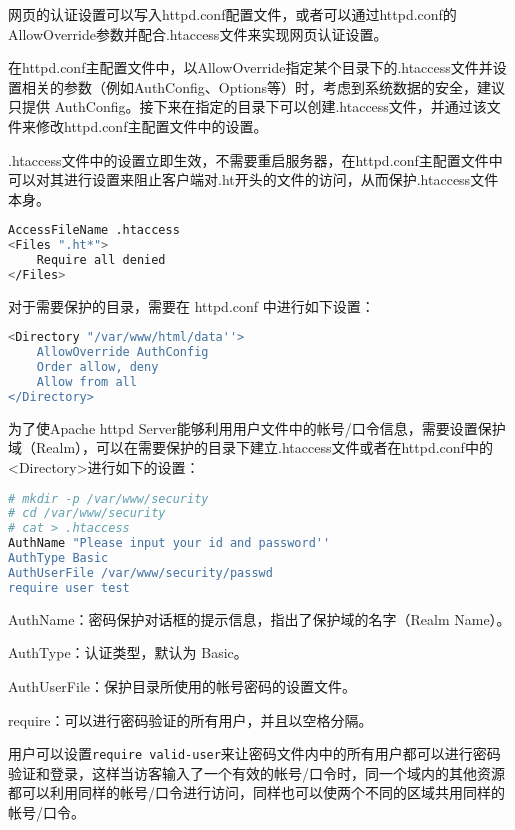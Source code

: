 网页的认证设置可以写入httpd.conf配置文件，或者可以通过httpd.conf的AllowOverride参数并配合.htaccess文件来实现网页认证设置。

在httpd.conf主配置文件中，以AllowOverride指定某个目录下的.htaccess文件并设置相关的参数（例如AuthConfig、Options等）时，考虑到系统数据的安全，建议只提供 AuthConfig。接下来在指定的目录下可以创建.htaccess文件，并通过该文件来修改httpd.conf主配置文件中的设置。


.htaccess文件中的设置立即生效，不需要重启服务器，在httpd.conf主配置文件中可以对其进行设置来阻止客户端对.ht开头的文件的访问，从而保护.htaccess文件本身。

\begin{lstlisting}[language=bash]
AccessFileName .htaccess
<Files ".ht*">
	Require all denied
</Files>
\end{lstlisting}

对于需要保护的目录，需要在 httpd.conf 中进行如下设置：


\begin{lstlisting}[language=bash]
<Directory "/var/www/html/data''>
	AllowOverride AuthConfig
	Order allow, deny
	Allow from all
</Directory>
\end{lstlisting}

为了使Apache httpd Server能够利用用户文件中的帐号/口令信息，需要设置保护域（Realm），可以在需要保护的目录下建立.htaccess文件或者在httpd.conf中的<Directory>进行如下的设置：


\begin{lstlisting}[language=bash]
# mkdir -p /var/www/security
# cd /var/www/security
# cat > .htaccess
AuthName "Please input your id and password''
AuthType Basic
AuthUserFile /var/www/security/passwd
require user test
\end{lstlisting}

\begin{compactitem}
\item AuthName：密码保护对话框的提示信息，指出了保护域的名字（Realm Name）。
\item AuthType：认证类型，默认为 Basic。
\item AuthUserFile：保护目录所使用的帐号密码的设置文件。
\item require：可以进行密码验证的所有用户，并且以空格分隔。
\end{compactitem}

用户可以设置\texttt{require valid-user}来让密码文件内中的所有用户都可以进行密码验证和登录，这样当访客输入了一个有效的帐号/口令时，同一个域内的其他资源都可以利用同样的帐号/口令进行访问，同样也可以使两个不同的区域共用同样的帐号/口令。

